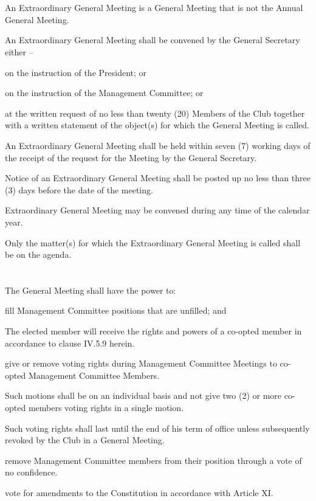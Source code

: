 \section{}
An Extraordinary General Meeting is a General Meeting that is not the Annual General Meeting.
	\begin{legal}
	\item An Extraordinary General Meeting shall be convened by the General Secretary either –
		\begin{legal}
		\item on the instruction of the President; or
		\item on the instruction of the Management Committee; or
		\item at the written request of no less than twenty (20) Members of the Club together with a written statement of the object(s) for which the General Meeting is called.
		\end{legal}
	\item An Extraordinary General Meeting shall be held within seven (7) working days of the receipt of the request for the Meeting by the General Secretary.
	\item Notice of an Extraordinary General Meeting shall be posted up no less than three (3) days before the date of the meeting.
	\item Extraordinary General Meeting may be convened during any time of the calendar year.
	\item Only the matter(s) for which the Extraordinary General Meeting is called shall be on the agenda.
	\end{legal}

\section{}
The General Meeting shall have the power to:
	\begin{legal}
	\item fill Management Committee positions that are unfilled; and
		\begin{legal}
		\item The elected member will receive the rights and powers of a co-opted member in accordance to clause IV.5.9 herein.
		\end{legal}
	\item give or remove voting rights during Management Committee Meetings to co-opted Management Committee Members.
		\begin{legal}
		\item Such motions shall be on an individual basis and not give two (2) or more co-opted members voting rights in a single motion.
		\item Such voting rights shall last until the end of his term of office unless subsequently revoked by the Club in a General Meeting.
		\end{legal}
	\item remove Management Committee members from their position through a vote of no confidence.
	\item vote for amendments to the Constitution in accordance with Article XI.
	\end{legal}


